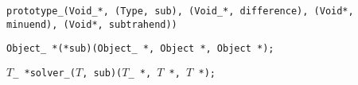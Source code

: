 
\tt{prototype_(Void_*, (Type, sub), (Void_*, difference), (Void*, minuend), (Void*, subtrahend))}


\tt{Object_ *(*sub)(Object_ *, Object *, Object *);}


$T$\tt{_ *solver_(}$T$\tt{, sub)(}$T$\tt{_ *,} $T$ \tt{*,} $T$ \tt{*);}
